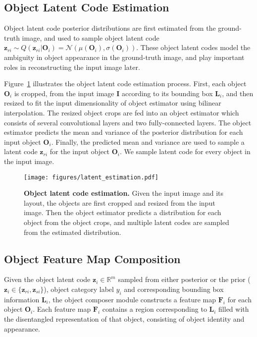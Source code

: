 \documentclass[10pt,twocolumn,letterpaper]{article}
\begin{document}
\subsection{Object Latent Code Estimation}
Object latent code posterior distributions are first estimated from the ground-truth image, and used to sample object latent code $\mathbf{z}_{ri} \sim Q(\mathbf{z}_{ri} | \mathbf{O}_i) =  \mathcal{N}(\mu(\mathbf{O}_i), \sigma(\mathbf{O}_i))$. 
These object latent codes model the ambiguity in object appearance in the ground-truth image, and play important roles in reconstructing the input image later.

Figure~\ref{fig:latent_code_estimation} illustrates the object latent code estimation process.
First, each object $\mathbf{O}_i$ is cropped, from the input image $\mathbf{I}$ according to its bounding box $\mathbf{L}_i$, and then resized to fit the input dimensionality of object estimator using bilinear interpolation. 
The resized object crops are fed into an object estimator which consists of several convolutional layers and two fully-connected layers. The object estimator predicts the mean and variance of the posterior distribution for each input object $\mathbf{O}_i$. 
Finally, the predicted mean and variance are used to sample a latent code $\mathbf{z}_{ri}$ for the input object $\mathbf{O}_i$.
We sample latent code for every object in the input image.

\begin{figure}[!t]
    \begin{center}
\texttt{[image: figures/latent\_estimation.pdf]}
    \end{center}
    \caption{{\bf Object latent code estimation.} Given the input image and its layout, the objects are first cropped and resized from the input image. Then the object estimator predicts a distribution for each object from the object crops, and multiple latent codes are sampled from the estimated distribution.}
    \label{fig:latent_code_estimation}
    \vspace{-0.1in}
\end{figure}

\subsection{Object Feature Map Composition}

Given the object latent code $\mathbf{z}_i \in \mathbb{R}^{m}$ sampled from either posterior or the prior ( $\mathbf{z}_i \in \{ \mathbf{z}_{ri}, \mathbf{z}_{si} \}$), object category label $y_i$ and corresponding bounding box information $\mathbf{L}_i$, the object composer module constructs a feature map $\mathbf{F}_i$ for each object $\mathbf{O}_i$. Each feature map $\mathbf{F}_i$ contains a region corresponding to $\mathbf{L}_i$ filled with the disentangled representation of that object, consisting of object identity and appearance.
\end{document}
